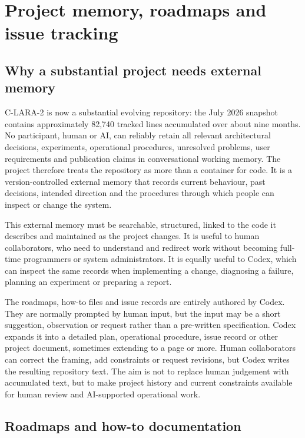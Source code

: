 \section{Project memory, roadmaps and issue tracking}

\subsection{Why a substantial project needs external memory}

C-LARA-2 is now a substantial evolving repository: the July 2026 snapshot
contains approximately 82,740 tracked lines accumulated over about nine
months. No participant, human or AI, can reliably retain all relevant
architectural decisions, experiments, operational procedures, unresolved
problems, user requirements and publication claims in conversational working
memory. The project therefore treats the repository as more than a container
for code. It is a version-controlled external memory that records current
behaviour, past decisions, intended direction and the procedures through which
people can inspect or change the system.

This external memory must be searchable, structured, linked to the code it
describes and maintained as the project changes. It is useful to human
collaborators, who need to understand and redirect work without becoming
full-time programmers or system administrators. It is equally useful to
Codex, which can inspect the same records when implementing a change,
diagnosing a failure, planning an experiment or preparing a report.

The roadmaps, how-to files and issue records are entirely authored by Codex.
They are normally prompted by human input, but the input may be a short
suggestion, observation or request rather than a pre-written specification.
Codex expands it into a detailed plan, operational procedure, issue record or
other project document, sometimes extending to a page or more. Human
collaborators can correct the framing, add constraints or request revisions,
but Codex writes the resulting repository text. The aim is not to replace
human judgement with accumulated text, but to make project history and current
constraints available for human review and AI-supported operational work.

\subsection{Roadmaps and how-to documentation}


